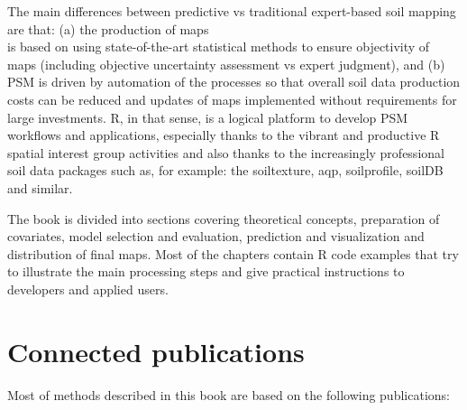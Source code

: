 \documentclass[graybox,natbib,nospthms,UStrade]{svmono}
\begin{document}
The main differences between predictive vs traditional expert-based soil mapping are that: (a) the production of maps\\
is based on using state-of-the-art statistical methods to ensure objectivity of maps (including objective uncertainty assessment vs expert judgment), and (b) PSM is driven by automation of the processes so that overall soil data production costs can be reduced and updates of maps implemented without requirements for large investments. R, in that sense, is a logical platform to develop PSM workflows and applications, especially thanks to the vibrant and productive R spatial interest group activities and also thanks to the increasingly professional soil data packages such as, for example: the soiltexture, aqp, soilprofile, soilDB and similar.

The book is divided into sections covering theoretical concepts, preparation of covariates, model selection and evaluation, prediction and visualization and distribution of final maps. Most of the chapters contain R code examples that try to illustrate the main processing steps and give practical instructions to developers and applied users.

\hypertarget{connected-publications}{%
\section*{Connected publications}\label{connected-publications}}

Most of methods described in this book are based on the following publications:
\end{document}
